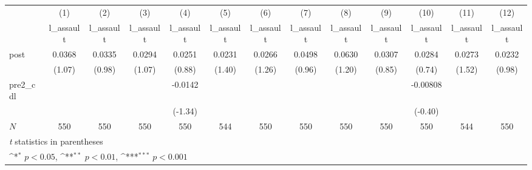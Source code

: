 {
\def\sym#1{\ifmmode^{#1}\else\(^{#1}\)\fi}
\begin{tabular}{l*{12}{c}}
\hline\hline
            &\multicolumn{1}{c}{(1)}&\multicolumn{1}{c}{(2)}&\multicolumn{1}{c}{(3)}&\multicolumn{1}{c}{(4)}&\multicolumn{1}{c}{(5)}&\multicolumn{1}{c}{(6)}&\multicolumn{1}{c}{(7)}&\multicolumn{1}{c}{(8)}&\multicolumn{1}{c}{(9)}&\multicolumn{1}{c}{(10)}&\multicolumn{1}{c}{(11)}&\multicolumn{1}{c}{(12)}\\
            &\multicolumn{1}{c}{l\_assault}&\multicolumn{1}{c}{l\_assault}&\multicolumn{1}{c}{l\_assault}&\multicolumn{1}{c}{l\_assault}&\multicolumn{1}{c}{l\_assault}&\multicolumn{1}{c}{l\_assault}&\multicolumn{1}{c}{l\_assault}&\multicolumn{1}{c}{l\_assault}&\multicolumn{1}{c}{l\_assault}&\multicolumn{1}{c}{l\_assault}&\multicolumn{1}{c}{l\_assault}&\multicolumn{1}{c}{l\_assault}\\
\hline
post        &      0.0368         &      0.0335         &      0.0294         &      0.0251         &      0.0231         &      0.0266         &      0.0498         &      0.0630         &      0.0307         &      0.0284         &      0.0273         &      0.0232         \\
            &      (1.07)         &      (0.98)         &      (1.07)         &      (0.88)         &      (1.40)         &      (1.26)         &      (0.96)         &      (1.20)         &      (0.85)         &      (0.74)         &      (1.52)         &      (0.98)         \\
[1em]
pre2\_cdl    &                     &                     &                     &     -0.0142         &                     &                     &                     &                     &                     &    -0.00808         &                     &                     \\
            &                     &                     &                     &     (-1.34)         &                     &                     &                     &                     &                     &     (-0.40)         &                     &                     \\
\hline
\(N\)       &         550         &         550         &         550         &         550         &         544         &         550         &         550         &         550         &         550         &         550         &         544         &         550         \\
\hline\hline
\multicolumn{13}{l}{\footnotesize \textit{t} statistics in parentheses}\\
\multicolumn{13}{l}{\footnotesize \sym{*} \(p<0.05\), \sym{**} \(p<0.01\), \sym{***} \(p<0.001\)}\\
\end{tabular}
}
